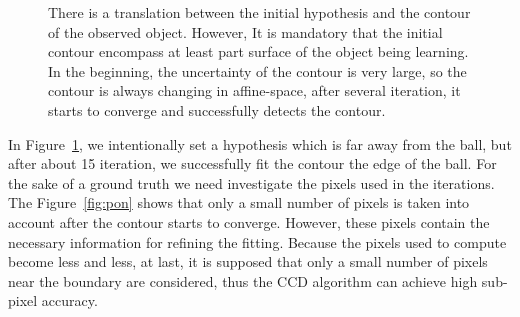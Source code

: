 \begin{figure}[htbp]
  \begin{minipage}[t]{0.5\linewidth} 
    \centering 
  \end{minipage} 
\caption[Segmentation of a ball]{There is a translation between the
  initial hypothesis and the contour of the observed object. However, It is
  mandatory that the initial contour encompass at least part surface
  of the object being learning. In the beginning, the uncertainty of
  the contour is very large, so the contour is always changing in
  affine-space, after several iteration, it starts to converge and
  successfully detects the contour.
\label{fig:sab}
}
\end{figure}

In Figure~\ref{fig:sab}, we intentionally set a hypothesis which is far away
from the ball, but after about 15 iteration, we successfully fit the
contour the edge of the ball. For the sake of a ground truth we need
investigate the pixels used in the iterations. The Figure~\ref{fig:pon} shows
that only a small number of pixels is taken into account after the
contour starts to converge. However, these pixels contain the
necessary information for refining the fitting. Because the pixels used
to compute become less and less, at last, it is supposed that
only a small number of pixels near the boundary are considered, thus the
CCD algorithm can achieve high sub-pixel accuracy.

